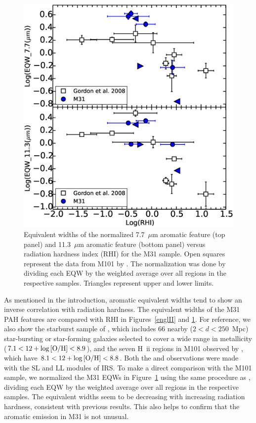\begin{figure}
\centering
\includegraphics[scale=0.30]{./Gordvsmy.eps}
\caption{Equivalent widths of the normalized 7.7~$\mu$m aromatic feature (top panel) and 11.3~$\mu$m aromatic feature (bottom panel) versus 
radiation hardness index (RHI) for the M31 sample. Open squares represent the data from M101 by \citet{Gordon:2008lr}. 
The normalization was done by dividing each EQW by the weighted average over all regions in the respective samples. Triangles represent upper and lower limits.}
\label{gordII}
\end{figure}


As mentioned in the introduction, aromatic equivalent widths tend to show an inverse correlation with radiation hardness. 
The equivalent widths of the M31 PAH features are compared with RHI in Figures~\ref{englII} and \ref{gordII}.
For reference, we also show the starburst sample of \citet{Engelbracht_2008}, which includes 66 nearby ($2<d<250$~Mpc)
star-bursting or star-forming galaxies selected to cover a wide range in metallicity ($7.1<12+\log{\rm[O/H]}<8.9$),
and the seven H~{\sc ii} regions in M101 observed by \citet{Gordon:2008lr}, which have $8.1<12+\log{\rm[O/H]}<8.8$.
Both the  \citet{Engelbracht_2008} and \citet{Gordon:2008lr} observations were made with the SL and LL modules of IRS. 
To make a direct comparison with the M101 sample, we normalized the M31 EQWs in Figure~\ref{gordII} using the same procedure
as \citet{Gordon:2008lr}, dividing each EQW by the  weighted average over all regions in the respective samples. 
The equivalent widths seem to be decreasing with increasing radiation hardness, consistent with previous results. 
This also helps to confirm that the aromatic emission in M31 is not unusual. 


